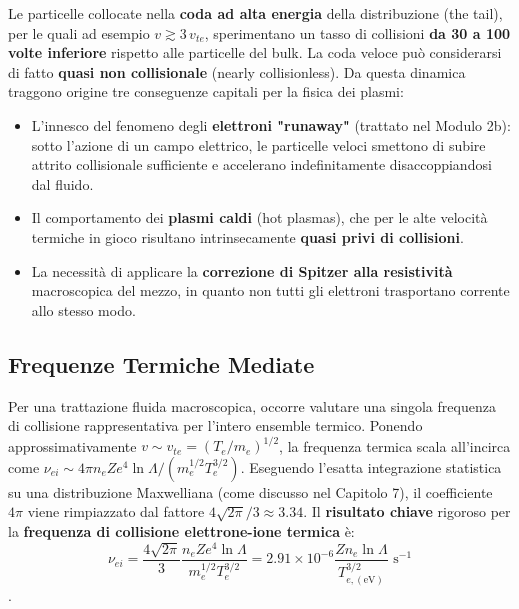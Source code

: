 Le particelle collocate nella \textbf{coda ad alta energia} della distribuzione (the tail), per le quali ad esempio $v \gtrsim 3 \, v_{te}$, sperimentano un tasso di collisioni \textbf{da 30 a 100 volte inferiore} rispetto alle particelle del bulk. La coda veloce può considerarsi di fatto \textbf{quasi non collisionale} (nearly collisionless).
Da questa dinamica traggono origine tre conseguenze capitali per la fisica dei plasmi:
\begin{itemize}
\item L'innesco del fenomeno degli \textbf{elettroni "runaway"} (trattato nel Modulo 2b): sotto l'azione di un campo elettrico, le particelle veloci smettono di subire attrito collisionale sufficiente e accelerano indefinitamente disaccoppiandosi dal fluido.
\item Il comportamento dei \textbf{plasmi caldi} (hot plasmas), che per le alte velocità termiche in gioco risultano intrinsecamente \textbf{quasi privi di collisioni}.
\item La necessità di applicare la \textbf{correzione di Spitzer alla resistività} macroscopica del mezzo, in quanto non tutti gli elettroni trasportano corrente allo stesso modo.
\end{itemize}

\subsection{Frequenze Termiche Mediate}
Per una trattazione fluida macroscopica, occorre valutare una singola frequenza di collisione rappresentativa per l'intero ensemble termico. Ponendo approssimativamente $v \sim v_{te} = (T_e / m_e)^{1/2}$, la frequenza termica scala all'incirca come $\nu_{ei} \sim 4\pi n_e Z e^4 \ln \Lambda / (m_e^{1/2} T_e^{3/2})$.
Eseguendo l'esatta integrazione statistica su una distribuzione Maxwelliana (come discusso nel Capitolo 7), il coefficiente $4\pi$ viene rimpiazzato dal fattore $4\sqrt{2\pi}/3 \approx 3.34$. Il \textbf{risultato chiave} rigoroso per la \textbf{frequenza di collisione elettrone-ione termica} è:
\begin{equation}
\nu_{ei} = \frac{4\sqrt{2\pi}}{3} \frac{n_e Z e^4 \ln \Lambda}{m_e^{1/2} T_e^{3/2}} = 2.91 \times 10^{-6} \frac{Z n_e \ln \Lambda}{T_{e , (\text{eV})}^{3/2}} \text{ s}^{-1}
\end{equation}
.

